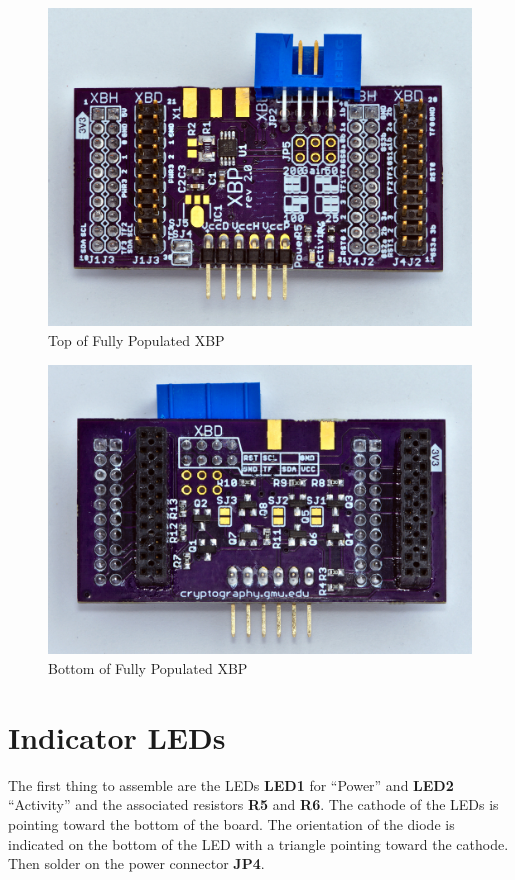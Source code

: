 \documentclass[twoside,11pt]{cergdoc}
\begin{document}
\begin{figure}[ht]
  \begin{center}
    \includegraphics[scale=0.8]{figures/xbp-full-top}
    \caption{Top of Fully Populated XBP}\label{fig:xbp-top}
  \end{center}
\end{figure}
\begin{figure}[ht]
  \begin{center}
    \includegraphics[scale=0.8]{figures/xbp-full-bottom}
    \caption{Bottom of Fully Populated XBP}\label{fig:xbp-bottom}
  \end{center}
\end{figure}

\section{Indicator LEDs}
The first thing to assemble are the LEDs \textbf{LED1} for ``Power'' and 
\textbf{LED2} ``Activity'' and the associated resistors \textbf{R5} and
\textbf{R6}. The cathode of the LEDs is pointing toward the bottom of the
board. The orientation of the diode is indicated on the bottom of the LED 
with a triangle pointing toward the cathode. 
Then solder on the power connector \textbf{JP4}.
\end{document}
